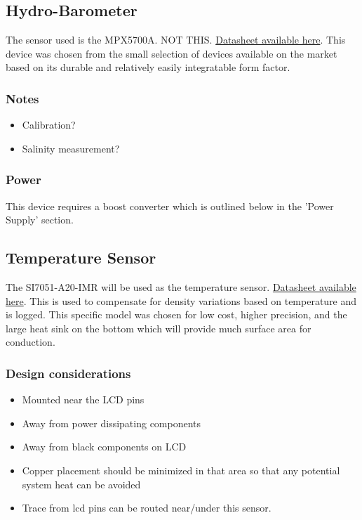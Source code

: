 \documentclass{article}
\begin{document}
\subsection{Hydro-Barometer}

The sensor used is the MPX5700A. NOT THIS. \href{https://www.nxp.com/docs/en/data-sheet/MPX5700.pdf}{Datasheet available here}. This device was chosen from the small selection of devices available on the market based on its durable and relatively easily integratable form factor. 

\subsubsection{Notes}
\begin{itemize}
    \item Calibration?
    \item Salinity measurement?
\end{itemize}

\subsubsection{Power}
This device requires a boost converter which is outlined below in the 'Power Supply' section.

\subsection{Temperature Sensor}
The SI7051-A20-IMR will be used as the temperature sensor. \href{https://www.silabs.com/documents/public/data-sheets/Si7050-1-3-4-5-A20.pdf}{Datasheet available here}. This is used to compensate for density variations based on temperature and is logged. This specific model was chosen for low cost, higher precision, and the large heat sink on the bottom which will provide much surface area for conduction.

\subsubsection{Design considerations}
\begin{itemize}
    \item Mounted near the LCD pins
    \item Away from power dissipating components
    \item Away from black components on LCD
    \item Copper placement should be minimized in that area so that any potential system heat can be avoided
    \item Trace from lcd pins can be routed near/under this sensor.
\end{itemize}
\end{document}
